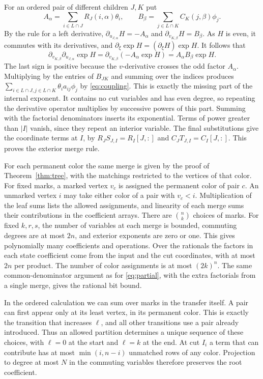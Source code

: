 \documentclass[11pt,reqno]{amsart}
\theoremstyle{remark}
\numberwithin{equation}{section}
\begin{document}
For an ordered pair of different children \(J,K\) put
\[
 A_\alpha=\sum_{i\in L\cap J}R_J(i,\alpha)\theta_i,\qquad
 B_\beta=\sum_{j\in L\cap K}C_K(j,\beta)\phi_j .
\]
By the rule for a left derivative, \(\partial_{u_{J,\alpha}}H=-A_\alpha\)
and \(\partial_{v_{K,\beta}}H=B_\beta\). As \(H\) is even, it commutes
with its derivatives, and \(\partial_\xi\exp H=(\partial_\xi H)\exp H\).
It follows that
\[
 \partial_{v_{K,\beta}}\partial_{u_{J,\alpha}}\exp H
       =\partial_{v_{K,\beta}}(-A_\alpha\exp H)
       =A_\alpha B_\beta\exp H .
\]
The last sign is positive because the \(v\)-derivative crosses the odd
factor \(A_\alpha\). Multiplying by the entries of \(B_{JK}\) and summing
over the indices produces \(\sum_{i\in L\cap J,j\in L\cap K} \theta_i
a_{ij}\phi_j\) by \eqref{eq:coupling}. This is exactly the missing part
of the internal exponent. It contains no cut variables and has even
degree, so repeating the derivative operator multiplies by successive
powers of this part. Summing with the factorial denominators inserts its
exponential. Terms of power greater than \(|I|\) vanish, since they
repeat an interior variable. The final substitutions give the coordinate
terms at \(I\), by \(R_JS_{J,I}=R_I[J,:]\) and \(C_JT_{J,I}=C_I[J,:]\).
This proves the exterior merge rule.

For each permanent color the same merge is given by the proof of
Theorem~\ref{thm:tree}, with the matchings restricted to the vertices of
that color. For fixed marks, a marked vertex \(v_c\) is assigned the
permanent color of pair \(c\). An unmarked vertex \(i\) may take either
color of a pair with \(v_c<i\). Multiplication of the leaf sums lists the
allowed assignments, and linearity of each merge sums their contributions
in the coefficient arrays. There are \(\binom nk\) choices of marks. For
fixed \(k,r,s\), the number of variables at each merge is bounded,
commuting degrees are at most \(2n\), and exterior exponents are zero or
one. This gives polynomially many coefficients and operations. Over the
rationals the factors in each state coefficient come from the input and
the cut coordinates, with at most \(2n\) per product. The number of color
assignments is at most \((2k)^n\). The same common-denominator argument
as for \eqref{eq:partial}, with the extra factorials from a single merge,
gives the rational bit bound.

In the ordered calculation we can sum over marks in the transfer itself.
A pair can first appear only at its least vertex, in its permanent color.
This is exactly the transition that increases \(\ell\), and all other
transitions use a pair already introduced. Thus an allowed partition
determines a unique sequence of these choices, with \(\ell=0\) at the
start and \(\ell=k\) at the end. At cut \(I_i\) a term that can
contribute has at most \(\min(i,n-i)\) unmatched rows of any color.
Projection to degree at most \(N\) in the commuting variables therefore
preserves the root coefficient.
\end{document}
